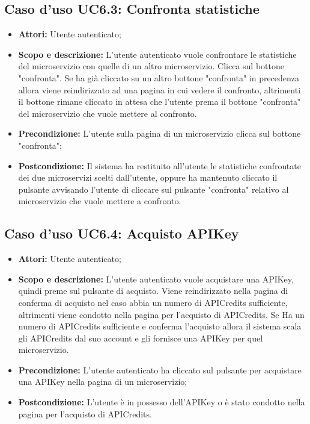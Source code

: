 \documentclass[12pt,a4paper,titlepage]{article}
\begin{document}
	\subsection{Caso d'uso UC6.3: Confronta statistiche}
	\label{UC6.3}
	\begin{itemize}
		\item \textbf{Attori: }Utente autenticato;
		\item \textbf{Scopo e descrizione: }L'utente autenticato vuole confrontare le statistiche del microservizio con quelle di un altro microservizio. Clicca sul bottone "confronta". Se ha già cliccato su un altro bottone "confronta" in precedenza allora viene reindirizzato ad una pagina in cui vedere il confronto, altrimenti il bottone rimane cliccato in attesa che l'utente prema il bottone "confronta" del microservizio che vuole mettere al confronto.
		\item \textbf{Precondizione: }L'utente sulla pagina di un microservizio clicca sul bottone "confronta";
		\item \textbf{Postcondizione: }Il sistema ha restituito all'utente le statistiche confrontate dei due microservizi scelti dall'utente, oppure ha mantenuto cliccato il pulsante avvisando l'utente di cliccare sul pulsante "confronta" relativo al microservizio che vuole mettere a confronto.
	\end{itemize}
	\subsection{Caso d'uso UC6.4: Acquisto APIKey}
	\label{UC6.4}
	\begin{itemize}
		\item \textbf{Attori: }Utente autenticato;
		\item \textbf{Scopo e descrizione: }L'utente autenticato vuole acquistare una APIKey, quindi preme sul pulsante di acquisto. Viene reindirizzato nella pagina di conferma di acquisto nel caso abbia un numero di APICredits sufficiente, altrimenti viene condotto nella pagina per l'acquisto di APICredits. Se Ha un numero di APICredits sufficiente e conferma l'acquisto allora il sistema scala gli APICredits dal suo account e gli fornisce una APIKey per quel microservizio.
		\item \textbf{Precondizione: }L'utente autenticato ha cliccato sul pulsante per acquistare una APIKey nella pagina di un microservizio;
		\item \textbf{Postcondizione: }L'utente è in possesso dell'APIKey o è stato condotto nella pagina per l'acquisto di APICredits.
	\end{itemize}
\end{document}
